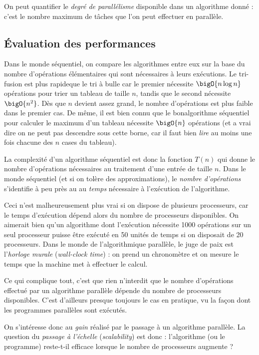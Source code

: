 On peut quantifier le \emph{degré de parallélisme} disponible dans un algorithme
donné : c'est le nombre maximum de tâches que l'on peut effectuer en parallèle.

\subsection{Évaluation des performances}

Dans le monde séquentiel, on compare les algorithmes entre eux sur la base du
nombre d'opérations élémentaires qui sont nécessaires à leurs exécutions. Le
tri-fusion est \og plus rapide\fg que le tri à bulle car le premier nécessite
$\bigO{n \log n}$ opérations pour trier un tableau de taille $n$, tandis que le
second nécessite $\bigO{n^2}$. Dès que $n$ devient assez grand, le nombre
d'opérations est plus faible dans le premier cas. De même, il est bien connu que
le \og bon\fg algorithme séquentiel pour calculer le maximum d'un tableau
nécessite $\bigO{n}$ opérations (et a vrai dire on ne peut pas descendre sous
cette borne, car il faut bien \emph{lire} au moins une fois chacune des $n$
cases du tableau).

La complexité d'un algorithme séquentiel est donc la fonction $T(n)$ qui donne
le nombre d'opérations nécessaires au traitement d'une entrée de taille
$n$. Dans le monde séquentiel (et si on tolère des approximations), le
\emph{nombre d'opérations} s'identifie à peu près au au \emph{temps} nécessaire
à l'exécution de l'algorithme.

Ceci n'est malheureusement plus vrai si on dispose de plusieurs processeurs, car
le temps d'exécution dépend alors du nombre de processeurs disponibles. On
aimerait bien qu'un algorithme dont l'exécution nécessite 1000 opérations sur un
seul processeur puisse être exécuté en 50 unités de temps si on disposait de 20
processeurs. Dans le monde de l'algorithmique parallèle, le juge de paix est
l'\emph{horloge murale} (\og \textit{wall-clock time}) : on prend un chronomètre
et on mesure le temps que la machine met à effectuer le calcul.

Ce qui complique tout, c'est que rien n'interdit que le nombre d'opérations
effectué par un algorithme parallèle dépende du nombre de processeurs
disponibles. C'est d'ailleurs presque toujours le cas en pratique, vu la façon
dont les programmes parallèles sont exécutés.

On s'intéresse donc au \emph{gain} réalisé par le passage à un algorithme
parallèle. La question du \emph{passage à l'échelle} (\textit{scalability}) est
donc : l'algorithme (ou le programme) reste-t-il efficace lorsque le nombre de
processeurs augmente ?


